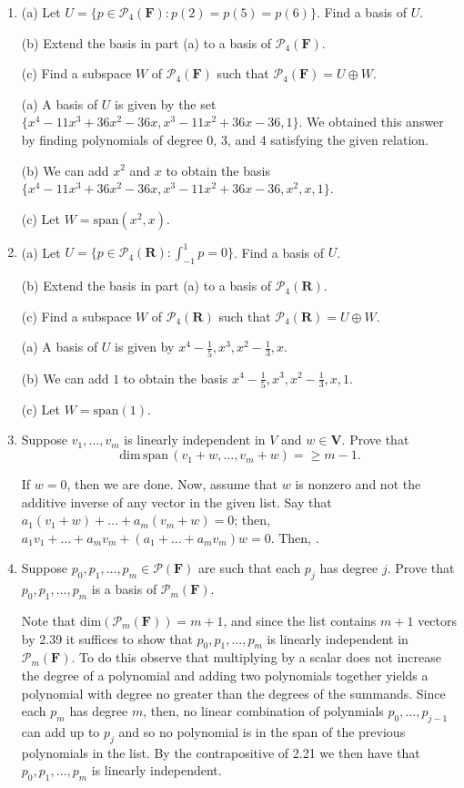 \documentclass{book}
\begin{document}
\begin{enumerate}
(c) Let \(W=\textrm{span}(x)\).

\item (a) Let \(U=\{p \in \mathcal{P}_4(\textbf{F}): p(2)=p(5)=p(6)\}\).  Find a basis of \(U\).

(b) Extend the basis in part (a) to a basis of \(\mathcal{P}_4(\textbf{F})\).

(c) Find a subspace \(W\) of \(\mathcal{P}_4(\textbf{F})\) such that \(\mathcal{P}_4(\textbf{F})=U \oplus W\).

(a) A basis of \(U\) is given by the set \(\{x^4-11x^3+36x^2-36x,x^3-11x^2+36x-36,1\}\).  We obtained this answer by finding polynomials of degree 0, 3, and 4 satisfying the given relation.

(b) We can add \(x^2\) and \(x\) to obtain the basis \(\{x^4-11x^3+36x^2-36x,x^3-11x^2+36x-36,x^2,x,1\}\).

(c) Let \(W=\textrm{span}(x^2,x)\).

\item (a) Let \(U=\{p \in \mathcal{P}_4(\textbf{R}): \int_{-1}^{1} p = 0\}\).  Find a basis of \(U\).

(b) Extend the basis in part (a) to a basis of \(\mathcal{P}_4(\textbf{R})\).

(c) Find a subspace \(W\) of \(\mathcal{P}_4(\textbf{R})\) such that \(\mathcal{P}_4(\textbf{R})=U \oplus W\).

(a) A basis of \(U\) is given by \(x^4-\frac{1}{5},x^3,x^2-\frac{1}{3},x\).

(b) We can add \(1\) to obtain the basis \(x^4-\frac{1}{5},x^3,x^2-\frac{1}{3},x,1\).

(c) Let \(W=\textrm{span}(1)\).

\item Suppose \(v_1,\dots,v_m\) is linearly independent in \(V\) and \(w \in \textbf{V}\).  Prove that \[\textrm{dim} \, \textrm{span} \, (v_1+w,\dots,v_m+w)= \geq m-1.\]

If \(w=0\), then we are done.  Now, assume that \(w\) is nonzero and not the additive inverse of any vector in the given list.  Say that \(a_1(v_1+w)+\dots+a_m(v_m+w)=0\); then, \(a_1v_1+\dots+a_mv_m+(a_1+\dots+a_mv_m)w=0\).  Then, .

\item Suppose \(p_0,p_1,\dots,p_m \in \mathcal{P}(\textbf{F})\) are such that each \(p_j\) has degree \(j\).  Prove that \(p_0,p_1,\dots,p_m\) is a basis of \(\mathcal{P}_m(\textbf{F})\).

Note that \(\textrm{dim}(\mathcal{P}_m(\textbf{F}))=m+1\), and since the list contains \(m+1\) vectors by 2.39 it suffices to show that \(p_0,p_1,\dots,p_m\) is linearly independent in \(\mathcal{P}_m(\textbf{F})\).  To do this observe that multiplying by a scalar does not increase the degree of a polynomial and adding two polynomials together yields a polynomial with degree no greater than the degrees of the summands.  Since each \(p_m\) has degree \(m\), then, no linear combination of polynmials \(p_0,\dots,p_{j-1}\) can add up to \(p_j\) and so no polynomial is in the span of the previous polynomials in the list.  By the contrapositive of 2.21 we then have that \(p_0,p_1,\dots,p_m\) is linearly independent.


\end{enumerate}
\end{document}
